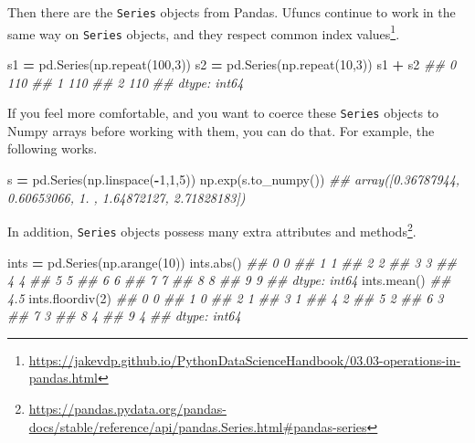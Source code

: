 \documentclass[
  12pt,
]{krantz}
\makeatletter
\newenvironment{Shaded}{\begin{snugshade}}{\end{snugshade}}
\newcommand{\BuiltInTok}[1]{#1}
\newcommand{\CommentTok}[1]{\textcolor[rgb]{0.37,0.37,0.37}{\textit{#1}}}
\newcommand{\DecValTok}[1]{\textcolor[rgb]{0.06,0.06,0.06}{#1}}
\newcommand{\NormalTok}[1]{#1}
\newcommand{\OperatorTok}[1]{\textcolor[rgb]{0.43,0.43,0.43}{\textbf{#1}}}
\renewcommand{\href}[2]{#2\footnote{\url{#1}}}
\newenvironment{kframe}{%
\medskip{}
\setlength{\fboxsep}{.8em}
 \def\at@end@of@kframe{}%
 \ifinner\ifhmode%
  \def\at@end@of@kframe{\end{minipage}}%
  \begin{minipage}{\columnwidth}%
 \fi\fi%
 \def\FrameCommand##1{\hskip\@totalleftmargin \hskip-\fboxsep
 \colorbox{shadecolor}{##1}\hskip-\fboxsep
     \hskip-\linewidth \hskip-\@totalleftmargin \hskip\columnwidth}%
 \MakeFramed {\advance\hsize-\width
   \@totalleftmargin\z@ \linewidth\hsize
   \@setminipage}}%
 {\par\unskip\endMakeFramed%
 \at@end@of@kframe}
\renewenvironment{Shaded}{\begin{kframe}}{\end{kframe}}
\makeatother
\begin{document}
Then there are the \texttt{Series} objects from Pandas. Ufuncs continue to work in the same way on \texttt{Series} objects, and they \href{https://jakevdp.github.io/PythonDataScienceHandbook/03.03-operations-in-pandas.html}{respect common index values}.

\begin{Shaded}
\begin{Highlighting}[]
\NormalTok{s1 }\OperatorTok{=}\NormalTok{ pd.Series(np.repeat(}\DecValTok{100}\NormalTok{,}\DecValTok{3}\NormalTok{))}
\NormalTok{s2 }\OperatorTok{=}\NormalTok{ pd.Series(np.repeat(}\DecValTok{10}\NormalTok{,}\DecValTok{3}\NormalTok{))}
\NormalTok{s1 }\OperatorTok{+}\NormalTok{ s2}
\CommentTok{\#\# 0    110}
\CommentTok{\#\# 1    110}
\CommentTok{\#\# 2    110}
\CommentTok{\#\# dtype: int64}
\end{Highlighting}
\end{Shaded}

If you feel more comfortable, and you want to coerce these \texttt{Series} objects to Numpy arrays before working with them, you can do that. For example, the following works.

\begin{Shaded}
\begin{Highlighting}[]
\NormalTok{s }\OperatorTok{=}\NormalTok{ pd.Series(np.linspace(}\OperatorTok{{-}}\DecValTok{1}\NormalTok{,}\DecValTok{1}\NormalTok{,}\DecValTok{5}\NormalTok{))}
\NormalTok{np.exp(s.to\_numpy())}
\CommentTok{\#\# array([0.36787944, 0.60653066, 1.        , 1.64872127, 2.71828183])}
\end{Highlighting}
\end{Shaded}

In addition, \texttt{Series} objects possess many extra \href{https://pandas.pydata.org/pandas-docs/stable/reference/api/pandas.Series.html\#pandas-series}{attributes and methods}.

\begin{Shaded}
\begin{Highlighting}[]
\NormalTok{ints }\OperatorTok{=}\NormalTok{ pd.Series(np.arange(}\DecValTok{10}\NormalTok{))}
\NormalTok{ints.}\BuiltInTok{abs}\NormalTok{()}
\CommentTok{\#\# 0    0}
\CommentTok{\#\# 1    1}
\CommentTok{\#\# 2    2}
\CommentTok{\#\# 3    3}
\CommentTok{\#\# 4    4}
\CommentTok{\#\# 5    5}
\CommentTok{\#\# 6    6}
\CommentTok{\#\# 7    7}
\CommentTok{\#\# 8    8}
\CommentTok{\#\# 9    9}
\CommentTok{\#\# dtype: int64}
\NormalTok{ints.mean()}
\CommentTok{\#\# 4.5}
\NormalTok{ints.floordiv(}\DecValTok{2}\NormalTok{)}
\CommentTok{\#\# 0    0}
\CommentTok{\#\# 1    0}
\CommentTok{\#\# 2    1}
\CommentTok{\#\# 3    1}
\CommentTok{\#\# 4    2}
\CommentTok{\#\# 5    2}
\CommentTok{\#\# 6    3}
\CommentTok{\#\# 7    3}
\CommentTok{\#\# 8    4}
\CommentTok{\#\# 9    4}
\CommentTok{\#\# dtype: int64}
\end{Highlighting}
\end{Shaded}
\end{document}
